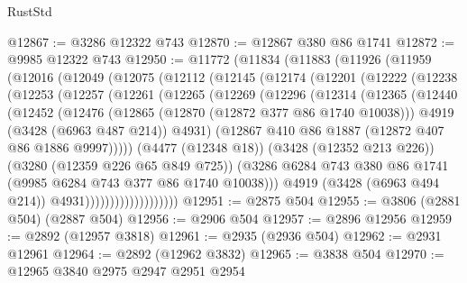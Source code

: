 \begin{lexlean}{RustStd}
\begin{coremodule}
@12867 := @3286 @12322 @743
@12870 := @12867 @380 @86 @1741
@12872 := @9985 @12322 @743
@12950 := @11772
    (@11834
      (@11883
        (@11926
          (@11959
            (@12016
              (@12049
                (@12075
                  (@12112
                    (@12145
                      (@12174
                        (@12201
                          (@12222
                            (@12238
                              (@12253
                                (@12257
                                  (@12261
                                    (@12265
                                      (@12269
                                        (@12296
                                          (@12314
                                            (@12365
                                              (@12440
                                                (@12452
                                                  (@12476
                                                    (@12865 (@12870 (@12872 @377 @86 @1740 @10038)))
                                                    @4919
                                                    (@3428 (@6963 @487 @214))
                                                    @4931)
                                                  (@12867
                                                    @410
                                                    @86
                                                    @1887
                                                    (@12872 @407 @86 @1886 @9997)))))
                                            (@4477 (@12348 @18))
                                            (@3428 (@12352 @213 @226))
                                            (@3280 (@12359 @226 @65 @849 @725))
                                            (@3286
                                              @6284
                                              @743
                                              @380
                                              @86
                                              @1741
                                              (@9985 @6284 @743 @377 @86 @1740 @10038)))
                                          @4919
                                          (@3428 (@6963 @494 @214))
                                          @4931)))))))))))))))))))
@12951 := @2875 @504
@12955 := @3806 (@2881 @504) (@2887 @504)
@12956 := @2906 @504
@12957 := @2896 @12956
@12959 := @2892 (@12957 @3818)
@12961 := @2935 (@2936 @504)
@12962 := @2931 @12961
@12964 := @2892 (@12962 @3832)
@12965 := @3838 @504
@12970 := @12965 @3840 @2975 @2947 @2951 @2954

\end{coremodule}
\end{lexlean}
